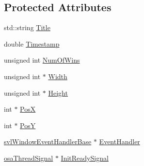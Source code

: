 \subsection*{Protected Attributes}
\begin{DoxyCompactItemize}
\item 
std\-::string \hyperlink{classsvl_window_manager_base_a2af9d334546d02350f18778ad285bfc9}{Title}
\item 
double \hyperlink{classsvl_window_manager_base_ab871436fe2017b584121cd703c6f5bed}{Timestamp}
\item 
unsigned int \hyperlink{classsvl_window_manager_base_aed1c8f66b156741ed6c14a7b6983cdc6}{Num\-Of\-Wins}
\item 
unsigned int $\ast$ \hyperlink{classsvl_window_manager_base_ab118e08eda56a7e8a3ecccf6e9fc68b7}{Width}
\item 
unsigned int $\ast$ \hyperlink{classsvl_window_manager_base_a69ad522db1adb6e2c36c774babca9349}{Height}
\item 
int $\ast$ \hyperlink{classsvl_window_manager_base_a51a3b510c6dbb08a8a400e0d539b864b}{Pos\-X}
\item 
int $\ast$ \hyperlink{classsvl_window_manager_base_aa256591f8f33a8ae99fac5cb296d8cb3}{Pos\-Y}
\item 
\hyperlink{classsvl_window_event_handler_base}{svl\-Window\-Event\-Handler\-Base} $\ast$ \hyperlink{classsvl_window_manager_base_a05b6711454ec8fc9b970e46bf79b9c67}{Event\-Handler}
\item 
\hyperlink{classosa_thread_signal}{osa\-Thread\-Signal} $\ast$ \hyperlink{classsvl_window_manager_base_a6f3f9fd7d3f9ee822d88131257272976}{Init\-Ready\-Signal}
\end{DoxyCompactItemize}



